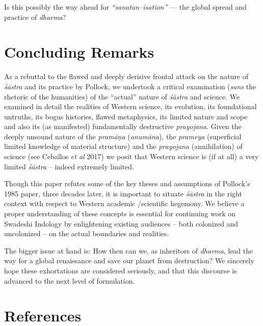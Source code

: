 Is this possibly the way ahead for \textit{“sanatan–isation”} — the global spread and practice of \textit{dharma}?


\section*{Concluding Remarks}

As a rebuttal to the flawed and deeply derisive frontal attack on the nature of \textit{śāstra} and its practice by Pollock, we undertook a critical examination (\textit{sans} the rhetoric of the humanities) of the “actual” nature of \textit{śāstra} and science. We examined in detail the realities of Western science, its evolution, its foundational untruths, its bogus histories, flawed metaphysics, its limited nature and scope and also its (as manifested) fundamentally destructive \textit{prayojana}. Given the deeply unsound nature of the \textit{pramāṇa} (\textit{anumāna}), the \textit{prameya} (superficial limited knowledge of material structure) and the \textit{prayojana} (annihilation) of science (see Ceballos \textit{et al} 2017) we posit that Western science is (if at all) a very limited \textit{śāstra} – indeed extremely limited.

Though this paper refutes some of the key theses and assumptions of Pollock’s 1985 paper, three decades later, it is important to situate \textit{śāstra} in the right context with respect to Western academic /scientific hegemony. We believe a proper understanding of these concepts is essential for continuing work on Swadeshi Indology by enlightening existing audiences – both colonized and uncolonized – on the actual boundaries and realities.

The bigger issue at hand is: How then can we, as inheritors of \textit{dharma}, lead the way for a global renaissance and save our planet from destruction? We sincerely hope these exhortations are considered seriously, and that this discourse is advanced to the next level of formulation.


\section*{References}

